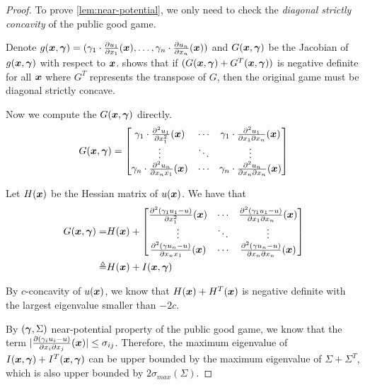 \begin{proof}

To prove \cref{lem:near-potential}, we only need to check the \emph{diagonal strictly concavity} of the public good game.

Denote $g({\bm{x}},\bm{\gamma}) = (\gamma_1\cdot \frac{\partial u_1}{\partial x_1}({\bm{x}}),\dots, \gamma_n\cdot \frac{\partial u_n}{\partial x_n}({\bm{x}}))$ and $G({\bm{x}}, \bm{\gamma})$ be the Jacobian of $g({\bm{x}}, \bm{\gamma})$ with respect to ${\bm{x}}$.
\citet{concave_game-initial:rosen1965existence} shows that if $(G({\bm{x}},\bm{\gamma}) + G^T({\bm{x}},\bm{\gamma}))$ is negative definite for all ${\bm{x}}$ where $G^T$ represents the transpose of $G$, then the original game must be diagonal strictly concave.

Now we compute the $G({\bm{x}},\bm{\gamma})$ directly.
\begin{align*}
    G({\bm{x}}, \bm{\gamma}) = \begin{bmatrix}
    \gamma_1\cdot \frac{\partial^2 u_1}{\partial x_1^2} ({\bm{x}}) & \cdots & \gamma_1\cdot\frac{\partial^2 u_1}{\partial x_1 \partial x_n}({\bm{x}})
    \\
    \vdots & \ddots & \vdots 
    \\
    \gamma_n\cdot \frac{\partial^2 u_n}{\partial x_n x_1} ({\bm{x}}) & \cdots & \gamma_n\cdot\frac{\partial^2 u_n}{\partial x_n \partial x_n}({\bm{x}})
    \end{bmatrix}
\end{align*}

Let $H({\bm{x}})$ be the Hessian matrix of $u({\bm{x}})$. We have that
\begin{align*}
    G({\bm{x}}, \bm{\gamma}) =& H({\bm{x}}) + \begin{bmatrix}
    \frac{\partial^2 (\gamma_1 u_1 - u)}{\partial x_1^2} ({\bm{x}}) & \cdots & \frac{\partial^2 (\gamma_1 u_1 - u)}{\partial x_1 \partial x_n}({\bm{x}})
    \\
    \vdots & \ddots & \vdots 
    \\
    \frac{\partial^2 (\gamma u_n - u)}{\partial x_n x_1} ({\bm{x}}) & \cdots & \frac{\partial^2 (\gamma u_n - u)}{\partial x_n \partial x_n}({\bm{x}})
    \end{bmatrix}
    \\
    \triangleq& H({\bm{x}}) + I({\bm{x}},\bm{\gamma}) 
\end{align*}

By $c$-concavity of $u({\bm{x}})$, we know that $H({\bm{x}}) + H^T({\bm{x}})$ is negative definite with the largest eigenvalue smaller than $-2c$. 

By $(\bm{\gamma},\Sigma)$ near-potential property of the public good game, we know that the term $|\frac{\partial (\gamma_i u_i - u)}{\partial x_i \partial x_j}({\bm{x}})| \le \sigma_{ij}$. Therefore, the maximum eigenvalue of $I({\bm{x}},\bm{\gamma}) + I^T({\bm{x}}, \bm{\gamma})$ can be upper bounded by the maximum eigenvalue of $\Sigma + \Sigma^T$, which is also upper bounded by $2 \sigma_{max}(\Sigma)$.


\end{proof}

